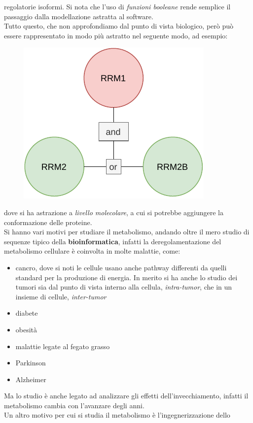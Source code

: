 \documentclass[a4paper,12pt, oneside]{book}
\begin{document}
regolatorie isoformi. Si nota che l'uso di \textit{funzioni booleane} rende
semplice il passaggio dalla modellazione astratta al software.\\
Tutto questo, che non approfondiamo dal punto di vista biologico, però può
essere rappresentato in modo più astratto nel seguente modo, ad esempio:
\begin{figure}[H]
  \centering
  \includegraphics[scale = 0.8]{img/ab2.pdf}
\end{figure}
dove si ha astrazione a \textit{livello molecolare}, a cui si
potrebbe aggiungere la conformazione delle proteine.\\
Si hanno vari motivi per studiare il metabolismo, andando oltre il mero studio
di sequenze tipico della \textbf{bioinformatica}, infatti la deregolamentazione
del metabolismo cellulare è coinvolta in molte malattie, come:
\begin{itemize}
  \item cancro, dove si noti le cellule usano anche pathway differenti da
  quelli standard per la produzione di energia. In merito si ha anche lo studio
  dei tumori sia dal punto di vista interno alla cellula, \textit{intra-tumor},
  che in un insieme di cellule, \textit{inter-tumor}
  \item diabete
  \item obesità
  \item malattie legate al fegato grasso
  \item Parkinson
  \item Alzheimer
\end{itemize}
Ma lo studio è anche legato ad analizzare gli effetti dell'invecchiamento,
infatti il metabolismo cambia con l'avanzare degli anni.\\
Un altro motivo per cui si studia il metabolismo è l'ingegnerizzazione dello
\end{document}

